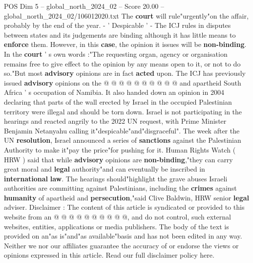 \begin{textsample}{POS Dim 5 – global\_north\_2024\_02 – Score 20.00 – global\_north\_2024\_02/106012020.txt}
The \textbf{court} will rule"urgently"on the affair, probably by the end of the year. - ' Despicable ' - The ICJ rules in disputes between states and its judgements are binding although it has little means to \textbf{enforce} them.
However, in this \textbf{case}, the opinion it issues will be \textbf{non-binding}.
In the \textbf{court} ' s own words :"The requesting organ, agency or organisation remains free to give effect to the opinion by any means open to it, or not to do so."But most \textbf{advisory} opinions are in fact \textbf{acted} upon.
The ICJ has previously issued \textbf{advisory} opinions on the @ @ @ @ @ @ @ @ @ @ and apartheid South Africa ' s occupation of Namibia.
It also handed down an opinion in 2004 declaring that parts of the wall erected by Israel in the occupied Palestinian territory were illegal and should be torn down.
Israel is not participating in the hearings and reacted angrily to the 2022 UN request, with Prime Minister Benjamin Netanyahu calling it"despicable"and"disgraceful".
The week after the UN \textbf{resolution}, Israel announced a series of \textbf{sanctions} against the Palestinian Authority to make it"pay the price"for pushing for it.
Human Rights Watch ( HRW ) said that while \textbf{advisory} opinions are \textbf{non-binding},"they can carry great moral and \textbf{legal} authority"and can eventually be inscribed in \textbf{international} \textbf{law}.
The hearings should"highlight the grave abuses Israeli authorities are committing against Palestinians, including the \textbf{crimes} against \textbf{humanity} of apartheid and \textbf{persecution},"said Clive Baldwin, HRW senior \textbf{legal} adviser.
Disclaimer : The content of this article is syndicated or provided to this website from an @ @ @ @ @ @ @ @ @ @, and do not control, such external websites, entities, applications or media publishers.
The body of the text is provided on an"as is"and"as available"basis and has not been edited in any way.
Neither we nor our affiliates guarantee the accuracy of or endorse the views or opinions expressed in this article.
Read our full disclaimer policy here.

\end{textsample}
